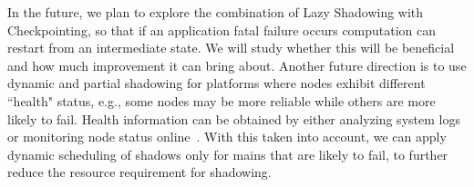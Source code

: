 In the future, we plan to explore the combination of Lazy Shadowing with Checkpointing, so that if an application fatal failure occurs computation can restart from an intermediate state. We will study whether this will be beneficial and how much improvement it can bring about. 
Another future direction is to use dynamic and partial shadowing for platforms where nodes exhibit different ``health" status, e.g., some nodes may be more reliable while others are more likely to fail. 
Health information can be obtained by either analyzing system logs or monitoring node status online~\cite{6468487}. 
With this taken into account, we can apply dynamic scheduling of shadows only for mains that are likely to fail, to further reduce the resource requirement for shadowing.

